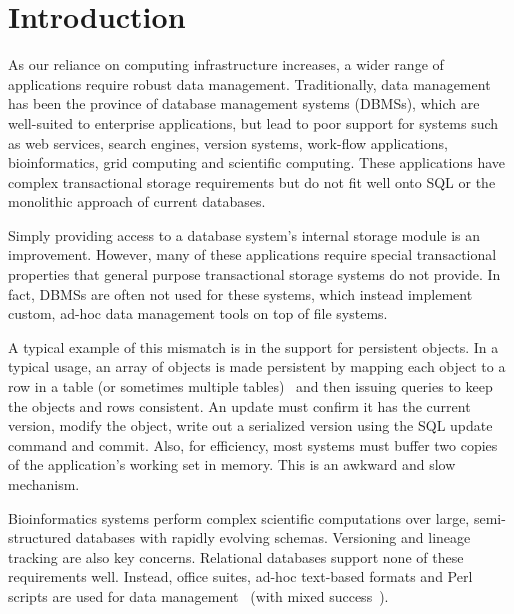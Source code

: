 \documentclass[letterpaper,twocolumn,10pt]{article}
\begin{document}




\section{Introduction}

As our reliance on computing infrastructure increases, a wider range of 
applications require robust data management.  Traditionally, data management
has been the province of database management systems (DBMSs), which are
well-suited to enterprise applications, but lead to poor support for
systems such as web services, search engines, version systems, work-flow 
applications, bioinformatics, grid computing and scientific computing.  These 
applications have complex transactional storage requirements
but do not fit well
onto SQL or the monolithic approach of current databases.  

Simply providing
access to a database system's internal storage module is an improvement.
However, many of these applications require special transactional properties 
that general purpose transactional storage systems do not provide.  In
fact, DBMSs are often not used for these systems, which instead
implement custom, ad-hoc data management tools on top of file
systems.

A typical example of this mismatch is in the support for
persistent objects.
In a typical usage, an array of objects is made persistent by
mapping each object to a row in a table (or sometimes multiple
tables)~\cite{hibernate} and then issuing queries to keep the objects and
rows consistent. An update must confirm it has the current
version, modify the object, write out a serialized version using the
SQL update command and commit.  Also, for efficiency, most systems must 
buffer two copies of the application's working set in memory.  
This is an awkward and slow mechanism.

Bioinformatics systems perform complex scientific
computations over large, semi-structured databases with rapidly evolving schemas.  Versioning and
lineage tracking are also key concerns.  Relational databases support
none of these requirements well.  Instead, office suites, ad-hoc
text-based formats and Perl scripts are used for data management~\cite{perl} (with mixed success~\cite{excel}).
\end{document}
